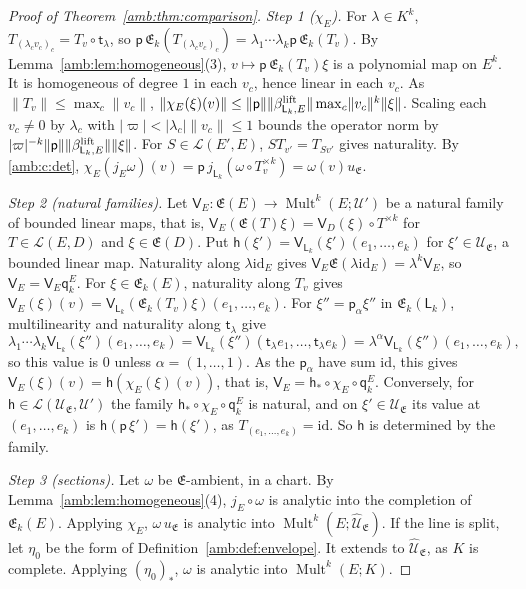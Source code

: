\documentclass[11pt]{amsart}
\theoremstyle{definition}
\theoremstyle{remark}
\numberwithin{equation}{section}
\newcommand{\cL}{\mathcal L}
\newcommand{\Mult}{\operatorname{Mult}}
\newcommand{\id}{\mathrm{id}}
\newcommand{\abs}[1]{\lvert #1\rvert}
\newcommand{\norm}[1]{\lVert #1\rVert}
\theoremstyle{plain}
\theoremstyle{definition}
\theoremstyle{plain}
\begin{document}
\begin{proof}[Proof of Theorem~\ref{amb:thm:comparison}]
\emph{Step 1 ($\chi_E$).} For $\lambda\in K^k$, $T_{(\lambda_cv_c)_c}=T_v\circ\mathsf t_\lambda$, so $\mathsf p\,\mathfrak E_k(T_{(\lambda_cv_c)_c})=\lambda_1\cdots\lambda_k\mathsf p\,\mathfrak E_k(T_v)$. By Lemma~\ref{amb:lem:homogeneous}(3), $v\mapsto\mathsf p\,\mathfrak E_k(T_v)\xi$ is a polynomial map on $E^k$. It is homogeneous of degree $1$ in each $v_c$, hence linear in each $v_c$. As $\norm{T_v}\le\max_c\norm{v_c}$, $\norm{\chi_E(\xi)(v)}\le\norm{\mathsf p}\norm{\beta^{\rm lift}_{\mathsf L_k,E}}\max_c\norm{v_c}^k\norm\xi$. Scaling each $v_c\ne0$ by $\lambda_c$ with $\abs\varpi<\abs{\lambda_c}\norm{v_c}\le1$ bounds the operator norm by $\abs\varpi^{-k}\norm{\mathsf p}\norm{\beta^{\rm lift}_{\mathsf L_k,E}}\norm\xi$. For $S\in\cL(E',E)$, $ST_{v'}=T_{Sv'}$ gives naturality. By \eqref{amb:c:det}, $\chi_E(j_E\omega)(v)=\mathsf p\,j_{\mathsf L_k}(\omega\circ T_v^{\times k})=\omega(v)u_{\mathfrak E}$.

\emph{Step 2 (natural families).} Let $\mathsf V_E\colon\mathfrak E(E)\to\Mult^k(E;\mathcal U')$ be a natural family of bounded linear maps, that is, $\mathsf V_E(\mathfrak E(T)\xi)=\mathsf V_D(\xi)\circ T^{\times k}$ for $T\in\cL(E,D)$ and $\xi\in\mathfrak E(D)$. Put $\mathsf h(\xi')=\mathsf V_{\mathsf L_k}(\xi')(e_1,\dots,e_k)$ for $\xi'\in\mathcal U_{\mathfrak E}$, a bounded linear map. Naturality along $\lambda\id_E$ gives $\mathsf V_E\mathfrak E(\lambda\id_E)=\lambda^k\mathsf V_E$, so $\mathsf V_E=\mathsf V_E\mathsf q_k^E$. For $\xi\in\mathfrak E_k(E)$, naturality along $T_v$ gives $\mathsf V_E(\xi)(v)=\mathsf V_{\mathsf L_k}(\mathfrak E_k(T_v)\xi)(e_1,\dots,e_k)$. For $\xi''=\mathsf p_\alpha\xi''$ in $\mathfrak E_k(\mathsf L_k)$, multilinearity and naturality along $\mathsf t_\lambda$ give
\[
 \lambda_1\cdots\lambda_k\mathsf V_{\mathsf L_k}(\xi'')(e_1,\dots,e_k)=\mathsf V_{\mathsf L_k}(\xi'')(\mathsf t_\lambda e_1,\dots,\mathsf t_\lambda e_k)=\lambda^\alpha\mathsf V_{\mathsf L_k}(\xi'')(e_1,\dots,e_k),
\]
so this value is $0$ unless $\alpha=(1,\dots,1)$. As the $\mathsf p_\alpha$ have sum $\id$, this gives $\mathsf V_E(\xi)(v)=\mathsf h(\chi_E(\xi)(v))$, that is, $\mathsf V_E=\mathsf h_*\circ\chi_E\circ\mathsf q_k^E$. Conversely, for $\mathsf h\in\cL(\mathcal U_{\mathfrak E},\mathcal U')$ the family $\mathsf h_*\circ\chi_E\circ\mathsf q_k^E$ is natural, and on $\xi'\in\mathcal U_{\mathfrak E}$ its value at $(e_1,\dots,e_k)$ is $\mathsf h(\mathsf p\,\xi')=\mathsf h(\xi')$, as $T_{(e_1,\dots,e_k)}=\id$. So $\mathsf h$ is determined by the family.

\emph{Step 3 (sections).} Let $\omega$ be $\mathfrak E$-ambient, in a chart. By Lemma~\ref{amb:lem:homogeneous}(4), $j_E\circ\omega$ is analytic into the completion of $\mathfrak E_k(E)$. Applying $\chi_E$, $\omega\,u_{\mathfrak E}$ is analytic into $\Mult^k(E;\widehat{\mathcal U}_{\mathfrak E})$. If the line is split, let $\eta_0$ be the form of Definition~\ref{amb:def:envelope}. It extends to $\widehat{\mathcal U}_{\mathfrak E}$, as $K$ is complete. Applying $(\eta_0)_*$, $\omega$ is analytic into $\Mult^k(E;K)$.
\end{proof}
\end{document}

